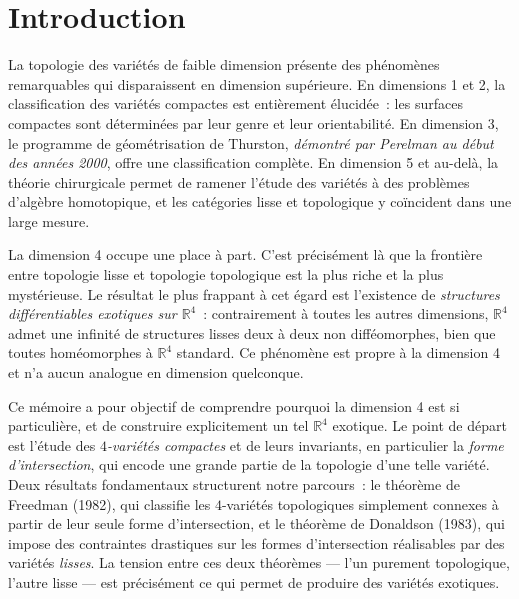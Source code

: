 \section*{Introduction}

La topologie des variétés de faible dimension présente des phénomènes remarquables qui disparaissent en dimension supérieure. En dimensions 1 et 2, la classification des variétés compactes est entièrement élucidée~: les surfaces compactes sont déterminées par leur genre et leur orientabilité. En dimension 3, le programme de géométrisation de Thurston, \textit{démontré par Perelman au début des années 2000}, offre une classification complète. En dimension 5 et au-delà, la théorie chirurgicale permet de ramener l'étude des variétés à des problèmes d'algèbre homotopique, et les catégories lisse et topologique y coïncident dans une large mesure.
 
La dimension 4 occupe une place à part. C'est précisément là que la frontière entre topologie lisse et topologie topologique est la plus riche et la plus mystérieuse. Le résultat le plus frappant à cet égard est l'existence de \emph{structures différentiables exotiques sur $\mathbb{R}^4$}~: contrairement à toutes les autres dimensions, $\mathbb{R}^4$ admet une infinité de structures lisses deux à deux non difféomorphes, bien que toutes homéomorphes à $\mathbb{R}^4$ standard. Ce phénomène est propre à la dimension 4 et n'a aucun analogue en dimension quelconque.
 
Ce mémoire a pour objectif de comprendre pourquoi la dimension 4 est si particulière, et de construire explicitement un tel $\mathbb{R}^4$ exotique. Le point de départ est l'étude des \emph{$4$-variétés compactes} et de leurs invariants, en particulier la \emph{forme d'intersection}, qui encode une grande partie de la topologie d'une telle variété. Deux résultats fondamentaux structurent notre parcours~: le théorème de Freedman (1982), qui classifie les $4$-variétés topologiques simplement connexes à partir de leur seule forme d'intersection, et le théorème de Donaldson (1983), qui impose des contraintes drastiques sur les formes d'intersection réalisables par des variétés \emph{lisses}. La tension entre ces deux théorèmes --- l'un purement topologique, l'autre lisse --- est précisément ce qui permet de produire des variétés exotiques.

